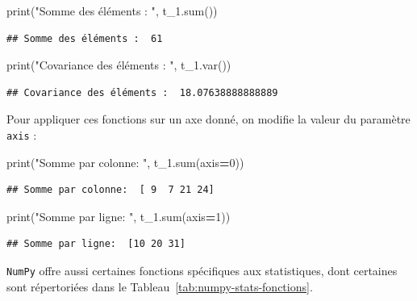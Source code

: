 \documentclass[12pt,]{book}
\newenvironment{Shaded}{\begin{snugshade}}{\end{snugshade}}
\newcommand{\DecValTok}[1]{\textcolor[rgb]{0.00,0.00,0.81}{#1}}
\newcommand{\StringTok}[1]{\textcolor[rgb]{0.31,0.60,0.02}{#1}}
\newcommand{\OperatorTok}[1]{\textcolor[rgb]{0.81,0.36,0.00}{\textbf{#1}}}
\newcommand{\BuiltInTok}[1]{#1}
\newcommand{\NormalTok}[1]{#1}
\numberwithin{equation}{section}
\numberwithin{countremarque}{section}
\begin{document}
\begin{Shaded}
\begin{Highlighting}[]
\BuiltInTok{print}\NormalTok{(}\StringTok{"Somme des éléments : "}\NormalTok{, t_1.}\BuiltInTok{sum}\NormalTok{())}
\end{Highlighting}
\end{Shaded}

\begin{lstlisting}
## Somme des éléments :  61
\end{lstlisting}

\begin{Shaded}
\begin{Highlighting}[]
\BuiltInTok{print}\NormalTok{(}\StringTok{"Covariance des éléments : "}\NormalTok{, t_1.var())}
\end{Highlighting}
\end{Shaded}

\begin{lstlisting}
## Covariance des éléments :  18.07638888888889
\end{lstlisting}

Pour appliquer ces fonctions sur un axe donné, on modifie la valeur du
paramètre \texttt{axis} :

\begin{Shaded}
\begin{Highlighting}[]
\BuiltInTok{print}\NormalTok{(}\StringTok{"Somme par colonne: "}\NormalTok{, t_1.}\BuiltInTok{sum}\NormalTok{(axis}\OperatorTok{=}\DecValTok{0}\NormalTok{))}
\end{Highlighting}
\end{Shaded}

\begin{lstlisting}
## Somme par colonne:  [ 9  7 21 24]
\end{lstlisting}

\begin{Shaded}
\begin{Highlighting}[]
\BuiltInTok{print}\NormalTok{(}\StringTok{"Somme par ligne: "}\NormalTok{, t_1.}\BuiltInTok{sum}\NormalTok{(axis}\OperatorTok{=}\DecValTok{1}\NormalTok{))}
\end{Highlighting}
\end{Shaded}

\begin{lstlisting}
## Somme par ligne:  [10 20 31]
\end{lstlisting}

\texttt{NumPy} offre aussi certaines fonctions spécifiques aux
statistiques, dont certaines sont répertoriées dans le
Tableau~\ref{tab:numpy-stats-fonctions}.
\end{document}
